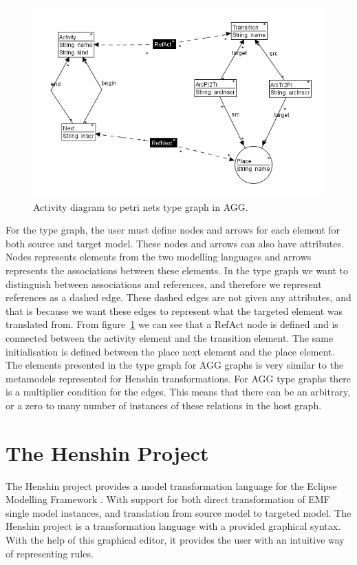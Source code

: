 \documentclass[pdftex,11pt,a4paper]{article}
\begin{document}
\begin{figure}[H]
	\centering
	\includegraphics[scale=0.7]{figures/AggTypeGraph.png}
	\caption{Activity diagram to petri nets type graph in AGG.}
	\label{fig:AggTypeGraph}
\end{figure}

\indent For the type graph, the user must define nodes and arrows for each
element for both source and target model. These nodes and arrows can also have
attributes. Nodes represents elements from the two modelling languages and
arrows represents the associations between these elements. In the type graph we
want to distinguish between associations and references, and therefore we
represent references as a dashed edge. These dashed edges are not given any
attributes, and that is because we want these edges to represent what the
targeted element was translated from. From figure~\ref{fig:AggTypeGraph} we can
see that a RefAct node is defined and is connected between the activity
element and the transition element. The same initialisation is defined between
the place next element and the place element. The elements presented in the
type graph for AGG graphs is very similar to the metamodels represented for
Henshin transformations. For AGG type graphs there is a multiplier condition for
the edges. This means that there can be an arbitrary, or a zero to many number of
instances of these relations in the host graph.

\section{The Henshin Project}

\noindent The Henshin project\cite{Henshin} provides a model transformation
language for the Eclipse Modelling Framework \cite{Steinberg2009}. With support for both direct 
transformation of EMF single model instances, and translation from source
model to targeted model. The Henshin project is a transformation language with a
provided graphical syntax. With the help of this graphical editor, it provides
the user with an intuitive way of representing rules. 
\end{document}
